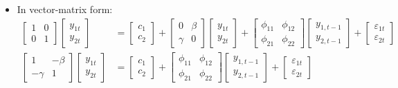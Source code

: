 \documentclass[notitlepage]{article}
\begin{document}
\begin{itemize}
    \item In vector-matrix form:
    \begin{align*}
        \begin{bmatrix} 1 & 0 \\ 0 & 1 \end{bmatrix}
        \begin{bmatrix} y_{1t} \\ y_{2t} \end{bmatrix} &=
        \begin{bmatrix} c_1 \\ c_2 \end{bmatrix} +
        \begin{bmatrix} 0 & \beta \\ \gamma & 0 \end{bmatrix}
        \begin{bmatrix} y_{1t} \\ y_{2t} \end{bmatrix} +
        \begin{bmatrix} \phi_{11} & \phi_{12} \\ \phi_{21} & \phi_{22} \end{bmatrix}
        \begin{bmatrix} y_{1,t-1} \\ y_{2,t-1} \end{bmatrix} +
        \begin{bmatrix} \varepsilon_{1t} \\ \varepsilon_{2t} \end{bmatrix} \\
        \begin{bmatrix} 1 & -\beta \\ -\gamma & 1 \end{bmatrix}
        \begin{bmatrix} y_{1t} \\ y_{2t} \end{bmatrix} &=
        \begin{bmatrix} c_1 \\ c_2 \end{bmatrix} +
        \begin{bmatrix} \phi_{11} & \phi_{12} \\ \phi_{21} & \phi_{22} \end{bmatrix}
        \begin{bmatrix} y_{1,t-1} \\ y_{2,t-1} \end{bmatrix} +
        \begin{bmatrix} \varepsilon_{1t} \\ \varepsilon_{2t} \end{bmatrix} 

\end{align*}
\end{itemize}
\end{document}

